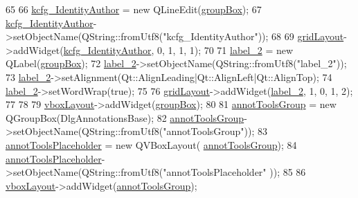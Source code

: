 \begin{DoxyCode}
65 
66         \hyperlink{classUi__DlgAnnotationsBase_a31e52a2794f81e8ca7aa944cadb58b57}{kcfg\_IdentityAuthor} = \textcolor{keyword}{new} QLineEdit(\hyperlink{classUi__DlgAnnotationsBase_a620f381886ee725e9471cbeb91976de4}{groupBox});
67         \hyperlink{classUi__DlgAnnotationsBase_a31e52a2794f81e8ca7aa944cadb58b57}{kcfg\_IdentityAuthor}->setObjectName(QString::fromUtf8(\textcolor{stringliteral}{"kcfg\_IdentityAuthor"}));
68 
69         \hyperlink{classUi__DlgAnnotationsBase_afb984e4e864caf321acbb31c3ff41cf1}{gridLayout}->addWidget(\hyperlink{classUi__DlgAnnotationsBase_a31e52a2794f81e8ca7aa944cadb58b57}{kcfg\_IdentityAuthor}, 0, 1, 1, 1);
70 
71         \hyperlink{classUi__DlgAnnotationsBase_a7a9e0688f3997341881b6f05d0cee180}{label\_2} = \textcolor{keyword}{new} QLabel(\hyperlink{classUi__DlgAnnotationsBase_a620f381886ee725e9471cbeb91976de4}{groupBox});
72         \hyperlink{classUi__DlgAnnotationsBase_a7a9e0688f3997341881b6f05d0cee180}{label\_2}->setObjectName(QString::fromUtf8(\textcolor{stringliteral}{"label\_2"}));
73         \hyperlink{classUi__DlgAnnotationsBase_a7a9e0688f3997341881b6f05d0cee180}{label\_2}->setAlignment(Qt::AlignLeading|Qt::AlignLeft|Qt::AlignTop);
74         \hyperlink{classUi__DlgAnnotationsBase_a7a9e0688f3997341881b6f05d0cee180}{label\_2}->setWordWrap(\textcolor{keyword}{true});
75 
76         \hyperlink{classUi__DlgAnnotationsBase_afb984e4e864caf321acbb31c3ff41cf1}{gridLayout}->addWidget(\hyperlink{classUi__DlgAnnotationsBase_a7a9e0688f3997341881b6f05d0cee180}{label\_2}, 1, 0, 1, 2);
77 
78 
79         \hyperlink{classUi__DlgAnnotationsBase_a3cca923483f98ed4e4002f2449f2d493}{vboxLayout}->addWidget(\hyperlink{classUi__DlgAnnotationsBase_a620f381886ee725e9471cbeb91976de4}{groupBox});
80 
81         \hyperlink{classUi__DlgAnnotationsBase_aef6cc8b1de7c7dbf6d4100f2f371bb77}{annotToolsGroup} = \textcolor{keyword}{new} QGroupBox(DlgAnnotationsBase);
82         \hyperlink{classUi__DlgAnnotationsBase_aef6cc8b1de7c7dbf6d4100f2f371bb77}{annotToolsGroup}->setObjectName(QString::fromUtf8(\textcolor{stringliteral}{"annotToolsGroup"}));
83         \hyperlink{classUi__DlgAnnotationsBase_a87373fcbb302ebee34dce288e76b7bec}{annotToolsPlaceholder} = \textcolor{keyword}{new} QVBoxLayout(
      \hyperlink{classUi__DlgAnnotationsBase_aef6cc8b1de7c7dbf6d4100f2f371bb77}{annotToolsGroup});
84         \hyperlink{classUi__DlgAnnotationsBase_a87373fcbb302ebee34dce288e76b7bec}{annotToolsPlaceholder}->setObjectName(QString::fromUtf8(\textcolor{stringliteral}{"annotToolsPlaceholder"}
      ));
85 
86         \hyperlink{classUi__DlgAnnotationsBase_a3cca923483f98ed4e4002f2449f2d493}{vboxLayout}->addWidget(\hyperlink{classUi__DlgAnnotationsBase_aef6cc8b1de7c7dbf6d4100f2f371bb77}{annotToolsGroup});

\end{DoxyCode}
